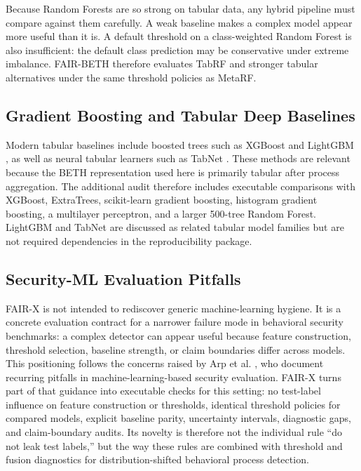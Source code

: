 \documentclass[journal]{IEEEtran}
\begin{document}
Because Random Forests are so strong on tabular data, any hybrid pipeline must compare against them carefully. A weak baseline makes a complex model appear more useful than it is. A default threshold on a class-weighted Random Forest is also insufficient: the default class prediction may be conservative under extreme imbalance. FAIR-BETH therefore evaluates TabRF and stronger tabular alternatives under the same threshold policies as MetaRF.

\subsection{Gradient Boosting and Tabular Deep Baselines}

Modern tabular baselines include boosted trees such as XGBoost \cite{chen2016xgboost} and LightGBM \cite{ke2017lightgbm}, as well as neural tabular learners such as TabNet \cite{arik2021tabnet}. These methods are relevant because the BETH representation used here is primarily tabular after process aggregation. The additional audit therefore includes executable comparisons with XGBoost, ExtraTrees, scikit-learn gradient boosting, histogram gradient boosting, a multilayer perceptron, and a larger 500-tree Random Forest. LightGBM and TabNet are discussed as related tabular model families but are not required dependencies in the reproducibility package.

\subsection{Security-ML Evaluation Pitfalls}

FAIR-X is not intended to rediscover generic machine-learning hygiene. It is a concrete evaluation contract for a narrower failure mode in behavioral security benchmarks: a complex detector can appear useful because feature construction, threshold selection, baseline strength, or claim boundaries differ across models. This positioning follows the concerns raised by Arp et al. \cite{arp2022}, who document recurring pitfalls in machine-learning-based security evaluation. FAIR-X turns part of that guidance into executable checks for this setting: no test-label influence on feature construction or thresholds, identical threshold policies for compared models, explicit baseline parity, uncertainty intervals, diagnostic gaps, and claim-boundary audits. Its novelty is therefore not the individual rule ``do not leak test labels,'' but the way these rules are combined with threshold and fusion diagnostics for distribution-shifted behavioral process detection.
\end{document}
